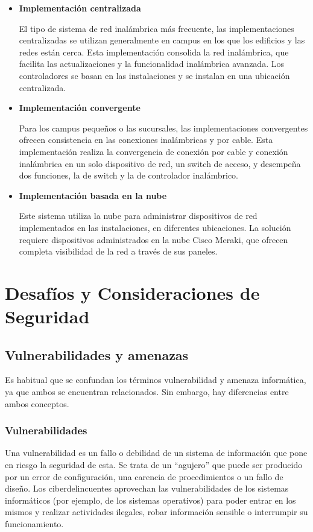 \documentclass[12pt]{article}
\begin{document}
  \begin{itemize}
    \item \textbf{Implementación centralizada}
    
    El tipo de sistema de red inalámbrica más frecuente, las implementaciones centralizadas se utilizan generalmente en campus en los que los edificios y las redes están cerca. Esta implementación consolida la red inalámbrica, que facilita las actualizaciones y la funcionalidad inalámbrica avanzada. Los controladores se basan en las instalaciones y se instalan en una ubicación centralizada.
    \item \textbf{Implementación convergente}
    
    Para los campus pequeños o las sucursales, las implementaciones convergentes ofrecen consistencia en las conexiones inalámbricas y por cable. Esta implementación realiza la convergencia de conexión por cable y conexión inalámbrica en un solo dispositivo de red, un switch de acceso, y desempeña dos funciones, la de switch y la de controlador inalámbrico.
    
    \item \textbf{Implementación basada en la nube}
    
    Este sistema utiliza la nube para administrar dispositivos de red implementados en las instalaciones, en diferentes ubicaciones. La solución requiere dispositivos administrados en la nube Cisco Meraki, que ofrecen completa visibilidad de la red a través de sus paneles.
  \end{itemize}

  \section*{Desafíos y Consideraciones de Seguridad}
  \subsection*{Vulnerabilidades y amenazas}
  Es habitual que se confundan los términos vulnerabilidad y amenaza informática, ya que ambos se encuentran relacionados. Sin embargo, hay diferencias entre ambos conceptos. 

  \subsubsection*{Vulnerabilidades}
  Una vulnerabilidad es un fallo o debilidad de un sistema de información que pone en riesgo la seguridad de esta. Se trata de un ``agujero'' que puede ser producido por un error de configuración, una carencia de procedimientos o un fallo de diseño. Los ciberdelincuentes aprovechan las vulnerabilidades de los sistemas informáticos (por ejemplo, de los sistemas operativos) para poder entrar en los mismos y realizar actividades ilegales, robar información sensible o interrumpir su funcionamiento. 
\end{document}
